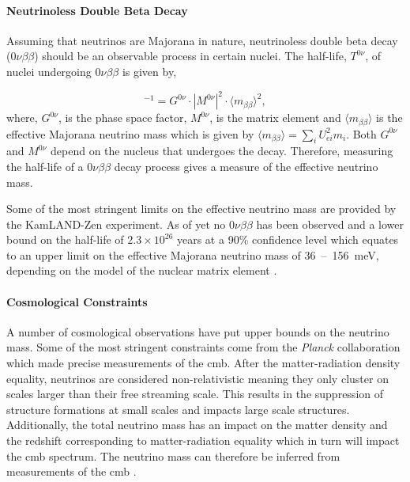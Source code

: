 \paragraph{Neutrinoless Double Beta Decay}
Assuming that neutrinos are Majorana in nature, neutrinoless double beta decay (0$\nu\beta\beta$) should be an observable process in certain nuclei. The half-life, $T^{0\nu}$, of nuclei undergoing $0\nu\beta\beta$ is given by, 

\begin{equation}
    [T^{0\nu}]^{-1} = G^{0\nu} \cdot |M^{0\nu}|^2 \cdot \langle m_{\beta\beta}\rangle^2,
\end{equation}
where, $G^{0\nu}$, is the phase space factor, $M^{0\nu}$, is the matrix element and $\langle m_{\beta\beta}\rangle$ is the effective Majorana neutrino mass which is given by $\langle m_{\beta\beta}\rangle = \sum_i U^2_{ei}m_i$. Both $G^{0\nu}$ and $M^{0\nu}$ depend on the nucleus that undergoes the decay. Therefore, measuring the half-life of a $0\nu\beta\beta$ decay process gives a measure of the effective neutrino mass. 

Some of the most stringent limits on the effective neutrino mass are provided by the KamLAND-Zen experiment. As of yet no $0\nu\beta\beta$ has been observed and a lower bound on the half-life of $2.3 \times 10^{26}$ years at a 90\% confidence level which equates to an upper limit on the effective Majorana neutrino mass of \mbox{36 -- 156 meV}, depending on the model of the nuclear matrix element \cite{kamlandZen}.

\paragraph{Cosmological Constraints}
A number of cosmological observations have put upper bounds on the neutrino mass. Some of the most stringent constraints come from the \textit{Planck} collaboration which made precise measurements of the \gls{cmb}. After the matter-radiation density equality, neutrinos are considered non-relativistic meaning they only cluster on scales larger than their free streaming scale. This results in the suppression of structure formations at small scales and impacts large scale structures. Additionally, the total neutrino mass has an impact on the matter density and the redshift corresponding to matter-radiation equality which in turn will impact the \gls{cmb} spectrum. The neutrino mass can therefore be inferred from measurements of the \gls{cmb} \cite{PDG_2022}\cite{planck_2018}. 

